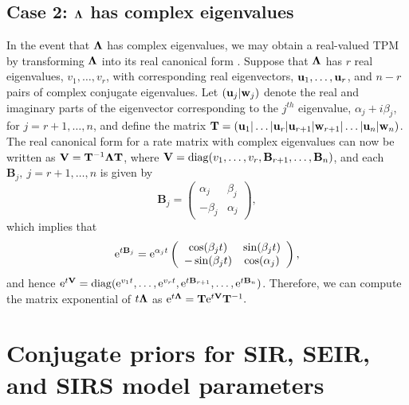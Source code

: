 \subsection{Case 2: $ \boldsymbol{\Lambda} $ has complex eigenvalues}
In the event that $ \boldsymbol{\Lambda} $ has complex eigenvalues, we may obtain a real-valued TPM by transforming $ \boldsymbol{\Lambda} $ into its real canonical form \citep{hirsch2013differential}. Suppose that $ \boldsymbol{\Lambda} $ has $ r $ real eigenvalues, $ v_1,\dots,v_r $, with corresponding real eigenvectors, $ \mathbf{u}_1,\dots,\mathbf{u}_r $, and $ n-r $ pairs of complex conjugate eigenvalues. Let $ (\mathbf{u}_j|\mathbf{w}_j) $ denote the real and imaginary parts of the eigenvector corresponding to the $ j^{th} $ eigenvalue, $ \alpha_j + i\beta_j $, for $ j = r+1,\dots,n $, and define the matrix $ \mathbf{T} = \left (\mathbf{u}_1|\dots|\mathbf{u}_r|\mathbf{u}_{r+1}|\mathbf{w}_{r+1}|\dots|\mathbf{u}_n|\mathbf{w}_n\right ) $. 
The real canonical form for a rate matrix with complex eigenvalues can now be written as $ \mathbf{V} = \mathbf{T}^{-1}\boldsymbol{\Lambda} \mathbf{T} $, where $ \mathbf{V} = \mathrm{diag}(v_1,\dots,v_r,\mathbf{B}_{r+1},\dots, \mathbf{B}_n) $, and each $ \mathbf{B}_j,\ j=r+1,\dots,n $ is given by 
\[ \mathbf{B}_j = \left (\begin{array}{cc}
\alpha_j & \beta_j \\
-\beta_j & \alpha_j
\end{array}\right ), \]
which implies that 
\[ \mathrm{e}^{t\mathbf{B}_j} = \mathrm{e}^{\alpha_jt}\left (\begin{array}{cc}
\cos(\beta_jt) & \sin(\beta_jt) \\
-\sin(\beta_jt) & \cos(\alpha_j)
\end{array}\right ), \]
and hence $ \mathrm{e}^{t\mathbf{V}} = \mathrm{diag}(\mathrm{e}^{v_1t},\dots,\mathrm{e}^{v_rt},\mathrm{e}^{t\mathbf{B}_{r+1}},\dots, \mathrm{e}^{t\mathbf{B}_n}) $. Therefore, we can compute the matrix exponential of $ t\boldsymbol{\Lambda} $ as $ \mathrm{e}^{t\boldsymbol{\Lambda}} = \mathbf{T}\mathrm{e}^{t\mathbf{V}}\mathbf{T}^{-1}. $

\section{Conjugate priors for SIR, SEIR, and SIRS model parameters}
\label{sec:bda_priors}

